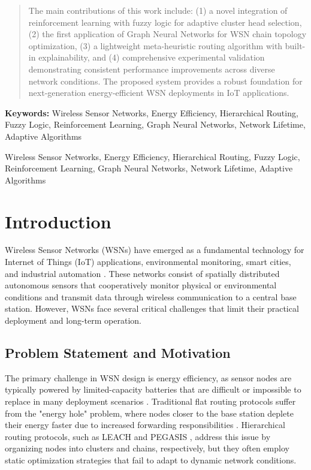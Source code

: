 \documentclass[conference]{IEEEtran}
\begin{document}
\begin{abstract}
The main contributions of this work include: (1) a novel integration of reinforcement learning with fuzzy logic for adaptive cluster head selection, (2) the first application of Graph Neural Networks for WSN chain topology optimization, (3) a lightweight meta-heuristic routing algorithm with built-in explainability, and (4) comprehensive experimental validation demonstrating consistent performance improvements across diverse network conditions. The proposed system provides a robust foundation for next-generation energy-efficient WSN deployments in IoT applications.
\end{abstract}

\textbf{Keywords:} Wireless Sensor Networks, Energy Efficiency, Hierarchical Routing, Fuzzy Logic, Reinforcement Learning, Graph Neural Networks, Network Lifetime, Adaptive Algorithms


\begin{IEEEkeywords}
Wireless Sensor Networks, Energy Efficiency, Hierarchical Routing, Fuzzy Logic, Reinforcement Learning, Graph Neural Networks, Network Lifetime, Adaptive Algorithms
\end{IEEEkeywords}


\section{Introduction}

Wireless Sensor Networks (WSNs) have emerged as a fundamental technology for Internet of Things (IoT) applications, environmental monitoring, smart cities, and industrial automation \cite{akyildiz2002wireless, yick2008wireless}. These networks consist of spatially distributed autonomous sensors that cooperatively monitor physical or environmental conditions and transmit data through wireless communication to a central base station. However, WSNs face several critical challenges that limit their practical deployment and long-term operation.

\subsection{Problem Statement and Motivation}

The primary challenge in WSN design is energy efficiency, as sensor nodes are typically powered by limited-capacity batteries that are difficult or impossible to replace in many deployment scenarios \cite{anastasi2009energy}. Traditional flat routing protocols suffer from the "energy hole" problem, where nodes closer to the base station deplete their energy faster due to increased forwarding responsibilities \cite{li2011energy}. Hierarchical routing protocols, such as LEACH \cite{heinzelman2000energy} and PEGASIS \cite{lindsey2002pegasis}, address this issue by organizing nodes into clusters and chains, respectively, but they often employ static optimization strategies that fail to adapt to dynamic network conditions.
\end{document}
